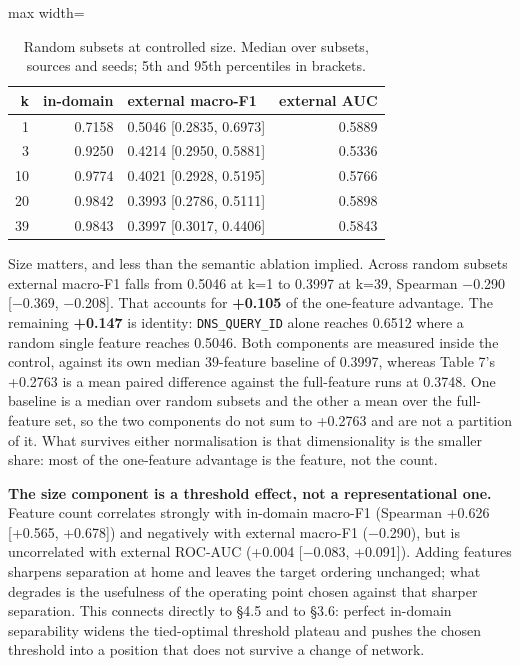 \documentclass[preprint,12pt]{elsarticle}
\begin{document}
\begin{table}[htbp]\centering\scriptsize
\caption{Random subsets at controlled size. Median over subsets, sources and seeds; 5th and 95th percentiles in brackets.}
\begin{adjustbox}{max width=\textwidth}\begin{tabular}{rrlr}
\toprule
k & in-domain & external macro-F1 & external AUC \\
\midrule
1 & 0.7158 & 0.5046 [0.2835, 0.6973] & 0.5889 \\
3 & 0.9250 & 0.4214 [0.2950, 0.5881] & 0.5336 \\
10 & 0.9774 & 0.4021 [0.2928, 0.5195] & 0.5766 \\
20 & 0.9842 & 0.3993 [0.2786, 0.5111] & 0.5898 \\
39 & 0.9843 & 0.3997 [0.3017, 0.4406] & 0.5843 \\
\bottomrule
\end{tabular}\end{adjustbox}
\end{table}

Size matters, and less than the semantic ablation implied. Across random subsets external macro-F1 falls from 0.5046 at k=1 to 0.3997 at k=39, Spearman $-$0.290 [$-$0.369, $-$0.208]. That accounts for \textbf{+0.105} of the one-feature advantage. The remaining \textbf{+0.147} is identity: \texttt{DNS\_QUERY\_ID} alone reaches 0.6512 where a random single feature reaches 0.5046. Both components are measured inside the control, against its own median 39-feature baseline of 0.3997, whereas Table 7's +0.2763 is a mean paired difference against the full-feature runs at 0.3748. One baseline is a median over random subsets and the other a mean over the full-feature set, so the two components do not sum to +0.2763 and are not a partition of it. What survives either normalisation is that dimensionality is the smaller share: most of the one-feature advantage is the feature, not the count.

\textbf{The size component is a threshold effect, not a representational one.} Feature count correlates strongly with in-domain macro-F1 (Spearman +0.626 [+0.565, +0.678]) and negatively with external macro-F1 ($-$0.290), but is uncorrelated with external ROC-AUC (+0.004 [$-$0.083, +0.091]). Adding features sharpens separation at home and leaves the target ordering unchanged; what degrades is the usefulness of the operating point chosen against that sharper separation. This connects directly to \S{}4.5 and to \S{}3.6: perfect in-domain separability widens the tied-optimal threshold plateau and pushes the chosen threshold into a position that does not survive a change of network.
\end{document}
